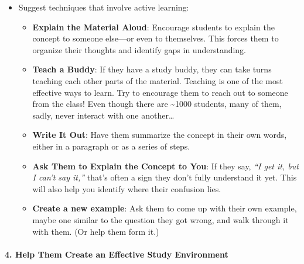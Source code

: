 \documentclass[
]{article}
\providecommand{\tightlist}{%
  \setlength{\itemsep}{0pt}\setlength{\parskip}{0pt}}
\begin{document}
\begin{itemize}
\tightlist
\item
  Suggest techniques that involve active learning:

  \begin{itemize}
  \tightlist
  \item
    \textbf{Explain the Material Aloud}: Encourage students to explain the concept to someone else---or even to themselves. This forces them to organize their thoughts and identify gaps in understanding.
  \item
    \textbf{Teach a Buddy}: If they have a study buddy, they can take turns teaching each other parts of the material. Teaching is one of the most effective ways to learn. Try to encourage them to reach out to someone from the class! Even though there are \textasciitilde1000 students, many of them, sadly, never interact with one another\ldots{}\\
  \item
    \textbf{Write It Out}: Have them summarize the concept in their own words, either in a paragraph or as a series of steps.
  \item
    \textbf{Ask Them to Explain the Concept to You}: If they say, \emph{``I get it, but I can't say it,''} that's often a sign they don't fully understand it yet. This will also help you identify where their confusion lies.
  \item
    \textbf{Create a new example}: Ask them to come up with their own example, maybe one similar to the question they got wrong, and walk through it with them. (Or help them form it.)
  \end{itemize}
\end{itemize}

\hypertarget{help-them-create-an-effective-study-environment}{%
\paragraph*{4. Help Them Create an Effective Study Environment}\label{help-them-create-an-effective-study-environment}}
\end{document}
